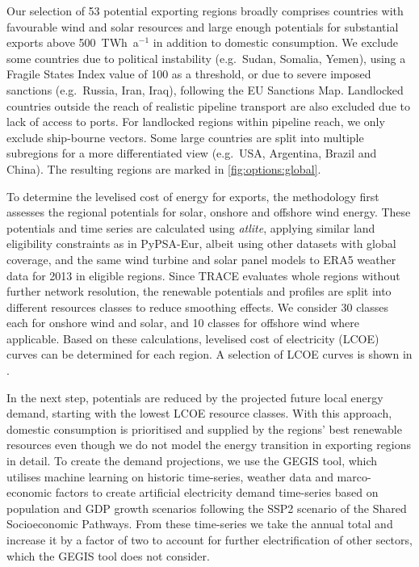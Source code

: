 Our selection of 53 potential exporting regions broadly comprises countries with
favourable wind and solar resources and large enough potentials for substantial
exports above 500~TWh~a$^{-1}$ in addition to domestic consumption. We exclude
some countries due to political instability (e.g.~Sudan, Somalia, Yemen), using
a Fragile States Index\cite{thefundforpeaceffpFragileStatesIndex2023} value of 100 as a threshold, or due
to severe imposed sanctions (e.g.~Russia, Iran, Iraq), following the EU
Sanctions Map.\cite{estonianpresidencyofthecounciloftheeuEUSanctionsMap2024}
Landlocked countries outside the reach of realistic pipeline transport are also
excluded due to lack of access to ports. For landlocked regions within pipeline
reach, we only exclude ship-bourne vectors. Some large countries are split into
multiple subregions for a more differentiated view (e.g.~USA, Argentina, Brazil
and China). The resulting regions are marked in \cref{fig:options:global}.


To determine the levelised cost of energy for exports, the methodology first
assesses the regional potentials for solar, onshore and offshore wind energy.
These potentials and time series are calculated using
\textit{atlite}\cite{hofmannAtliteLightweight2021}, applying similar land
eligibility constraints as in PyPSA-Eur, albeit using other datasets with global
coverage, and the same wind turbine and solar panel models to ERA5\cite{ecmwf}
weather data for 2013 in eligible regions. Since TRACE evaluates whole regions
without further network resolution, the renewable potentials and profiles are
split into different resources classes to reduce smoothing effects. We consider
30 classes each for onshore wind and solar, and 10 classes for offshore wind
where applicable. Based on these calculations, levelised cost of electricity
(LCOE) curves can be determined for each region. A selection of LCOE curves is
shown in .


In the next step, potentials are reduced by the projected future local energy
demand, starting with the lowest LCOE resource classes. With this approach,
domestic consumption is prioritised and supplied by the regions' best renewable
resources even though we do not model the energy transition in exporting regions
in detail. To create the demand projections, we use the
GEGIS\cite{mattssonAutopilotEnergyModels2021} tool, which utilises machine
learning on historic time-series, weather data and marco-economic factors to
create artificial electricity demand time-series based on population and GDP
growth scenarios following the SSP2 scenario of the Shared Socioeconomic
Pathways.\cite{riahiSharedSocioeconomicPathways2017} From these time-series we
take the annual total and increase it by a factor of two to account for further
electrification of other sectors, which the GEGIS tool does not consider.

